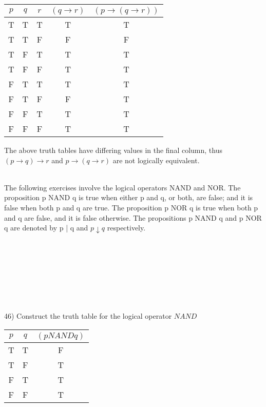\documentclass{article}
\begin{document}
\begin{flushleft}
\begin{table}[ht]
\begin{tabular}{|c|c|c||c|c|}
\end{tabular}
\label{table:tt1}
\end{table}

\begin{table}[ht]

\begin{tabular}{|c|c|c||c|c|}

$ p $ & $ q $ & $ r $ & $ (q \rightarrow r) $ & $ (p \rightarrow (q \rightarrow r)) $ \\
\hline
T & T & T & T & T \\
\hline
T & T & F & F & F \\
\hline
T & F & T & T & T \\
\hline
T & F & F & T & T \\
\hline
F & T & T & T & T \\
\hline
F & T & F & F & T \\
\hline
F & F & T & T & T \\
\hline
F & F & F & T & T \\

\end{tabular}
\label{table:tt1}
\end{table}

The above truth tables have differing values in the final column, thus $(p \rightarrow q) \rightarrow r$ and $p \rightarrow (q \rightarrow r)$ are  not logically equivalent.

~\\The following exercises involve the logical operators NAND and NOR.  The proposition p NAND q is true when either p and q, or both, are false; and it is false when both p and q are true.  The proposition p NOR q is true when both p and q are false, and it is false otherwise.  The propositions p NAND q and p NOR q are denoted by p | q and $p \downarrow q$ respectively.

~\\~\\~\\~\\~\\~\\~\\
46) Construct the truth table for the logical operator $NAND$
\begin{table}[ht]
\begin{tabular}{|c|c||c|}

$ p $ & $ q $ & $ (p NAND q) $ \\
\hline
T & T & F \\
\hline
T & F & T \\
\hline
F & T & T \\
\hline
F & F & T \\


\end{tabular}
\end{table}
\end{flushleft}
\end{document}
